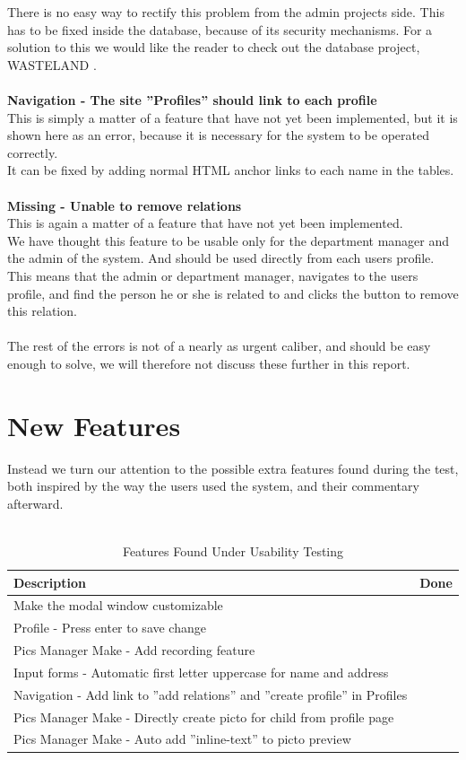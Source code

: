 There is no easy way to rectify this problem from the admin projects side. This has to be fixed inside the database, because of its security mechanisms. For a solution to this we would like the reader to check out the database project, WASTELAND \citep{wasteland}.\\
\\
\textbf{Navigation - The site ''Profiles'' should link to each profile}\\
This is simply a matter of a feature that have not yet been implemented, but it is shown here as an error, because it is necessary for the system to be operated correctly.\\
It can be fixed by adding normal HTML anchor links to each name in the tables.\\
\\
\textbf{Missing - Unable to remove relations}\\
This is again a matter of a feature that have not yet been implemented.\\
We have thought this feature to be usable only for the department manager and the admin of the system. And should be used directly from each users profile. This means that the admin or department manager, navigates to the users profile, and find the person he or she is related to and clicks the button to remove this relation.\\
\\
The rest of the errors is not of a nearly as urgent caliber, and should be easy enough to solve, we will therefore not discuss these further in this report.\\

\section{New Features}
Instead we turn our attention to the possible extra features found during the test, both inspired by the way the users used the system, and their commentary afterward.\\
\\

\begin{table}[htbp]
	\centering
		\begin{tabular}{|l|l|}
			\hline
			Description & Done\\\hline\hline
			Make the modal window customizable &\\\hline
			Profile - Press enter to save change &\\\hline
			Pics Manager Make - Add recording feature&\\\hline
			Input forms - Automatic first letter uppercase for name and address&\\\hline  
			Navigation - Add link to ''add relations'' and ''create profile'' in Profiles & \\\hline  
			Pics Manager Make - Directly create picto for child from profile page & \\\hline
			Pics Manager Make - Auto add ''inline-text'' to picto preview & \\\hline
		\end{tabular}
	\caption{Features Found Under Usability Testing}
	\label{tab:NewFeature}
\end{table}	


